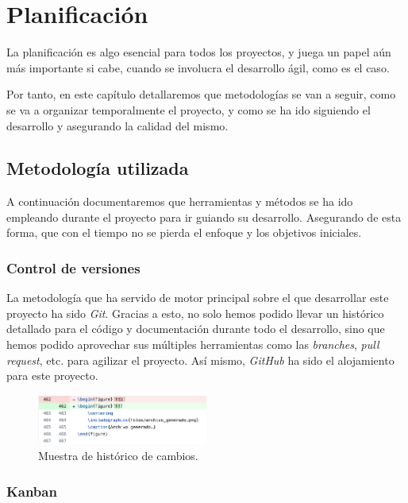 \chapter{Planificación}

La planificación es algo esencial para todos los proyectos, y juega un papel aún 
más importante si cabe, cuando se involucra el desarrollo ágil, como es el caso. 

Por tanto, en este capítulo detallaremos que metodologías se van a seguir, como 
se va a organizar temporalmente el proyecto, y como se ha ido siguiendo el 
desarrollo y asegurando la calidad del mismo. 

\section{Metodología utilizada}

A continuación documentaremos que herramientas y métodos se ha ido empleando 
durante el proyecto para ir guiando su desarrollo. Asegurando de esta forma, que 
con el tiempo no se pierda el enfoque y los objetivos iniciales. 

\subsection{Control de versiones}

La metodología que ha servido de motor principal sobre el que desarrollar este
proyecto ha sido \emph{Git}. Gracias a esto, no solo hemos podido llevar un
histórico detallado para el código y documentación durante todo el desarrollo,
sino que hemos podido aprovechar sus múltiples herramientas como las
\emph{branches}, \emph{pull request}, etc. para agilizar el proyecto. Así mismo,
\emph{GitHub} ha sido el alojamiento para este proyecto.

\begin{figure}[H]
    \centering
    \includegraphics[width=0.5\textwidth]{fotos/control_versiones.png}
    \caption{Muestra de histórico de cambios.}
\end{figure}

\subsection{Kanban}

